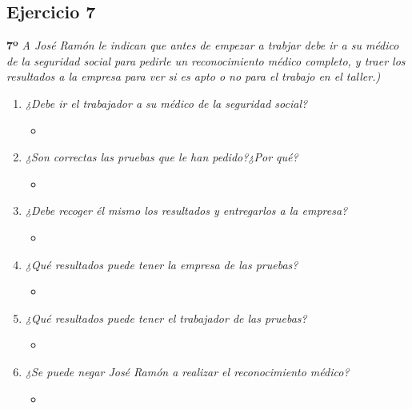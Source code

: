 \documentclass{article}
\begin{document}
        \subsection{Ejercicio 7}
        \textbf{7º} \textit{A José Ramón le indican que antes de empezar a trabjar debe ir a su médico de la seguridad social para pedirle un reconocimiento médico completo, y traer los resultados a la empresa para ver si es 
        apto o no para el trabajo en el taller.)}
        \\
        \begin{enumerate}[label=(\alph*)]
          \item \textit{¿Debe ir el trabajador a su médico de la seguridad social?}
            \begin{itemize}
              \item 
            \end{itemize}
          \item \textit{¿Son correctas las pruebas que le han pedido?¿Por qué?}
            \begin{itemize}
              \item 
            \end{itemize}
          \item \textit{¿Debe recoger él mismo los resultados y entregarlos a la empresa?}
            \begin{itemize}
              \item 
            \end{itemize}
          \item \textit{¿Qué resultados puede tener la empresa de las pruebas?}
            \begin{itemize}
              \item 
            \end{itemize}
          \item \textit{¿Qué resultados puede tener el trabajador de las pruebas?}
            \begin{itemize}
              \item 
            \end{itemize}
          \item \textit{¿Se puede negar José Ramón a realizar el reconocimiento médico?}
            \begin{itemize}
              \item
            \end{itemize}
        \end{enumerate}
      \newpage
\end{document}
